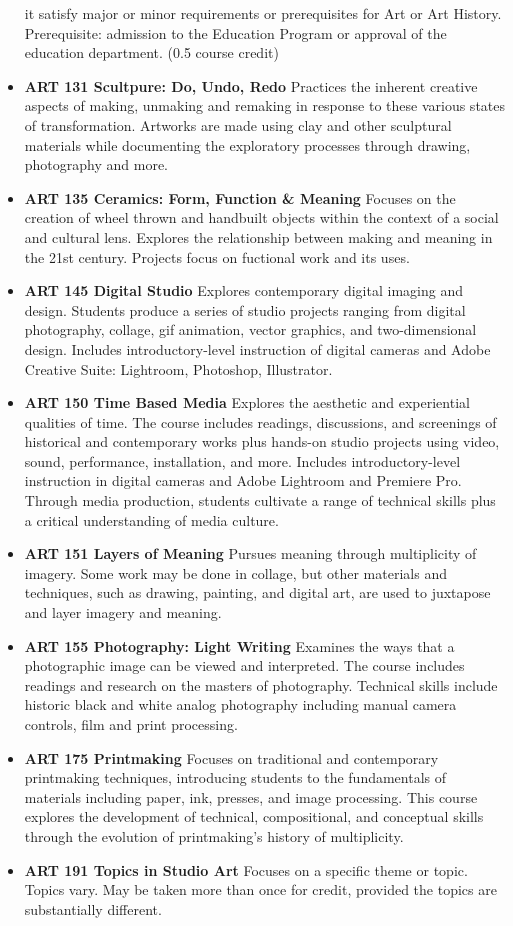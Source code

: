 \documentclass[
  letterpaper,
]{scrbook}
\begin{document}
\begin{itemize}
  it satisfy major or minor requirements or prerequisites for Art or Art
  History. Prerequisite: admission to the Education Program or approval
  of the education department. (0.5 course credit)
\item
  \textbf{ART 131 Scultpure: Do, Undo, Redo} Practices the inherent
  creative aspects of making, unmaking and remaking in response to these
  various states of transformation. Artworks are made using clay and
  other sculptural materials while documenting the exploratory processes
  through drawing, photography and more.
\item
  \textbf{ART 135 Ceramics: Form, Function \& Meaning} Focuses on the
  creation of wheel thrown and handbuilt objects within the context of a
  social and cultural lens. Explores the relationship between making and
  meaning in the 21st century. Projects focus on fuctional work and its
  uses.
\item
  \textbf{ART 145 Digital Studio} Explores contemporary digital imaging
  and design. Students produce a series of studio projects ranging from
  digital photography, collage, gif animation, vector graphics, and
  two-dimensional design. Includes introductory-level instruction of
  digital cameras and Adobe Creative Suite: Lightroom, Photoshop,
  Illustrator.
\item
  \textbf{ART 150 Time Based Media} Explores the aesthetic and
  experiential qualities of time. The course includes readings,
  discussions, and screenings of historical and contemporary works plus
  hands-on studio projects using video, sound, performance,
  installation, and more. Includes introductory-level instruction in
  digital cameras and Adobe Lightroom and Premiere Pro. Through media
  production, students cultivate a range of technical skills plus a
  critical understanding of media culture.
\item
  \textbf{ART 151 Layers of Meaning} Pursues meaning through
  multiplicity of imagery. Some work may be done in collage, but other
  materials and techniques, such as drawing, painting, and digital art,
  are used to juxtapose and layer imagery and meaning.
\item
  \textbf{ART 155 Photography: Light Writing} Examines the ways that a
  photographic image can be viewed and interpreted. The course includes
  readings and research on the masters of photography. Technical skills
  include historic black and white analog photography including manual
  camera controls, film and print processing.
\item
  \textbf{ART 175 Printmaking} Focuses on traditional and contemporary
  printmaking techniques, introducing students to the fundamentals of
  materials including paper, ink, presses, and image processing. This
  course explores the development of technical, compositional, and
  conceptual skills through the evolution of printmaking's history of
  multiplicity.
\item
  \textbf{ART 191 Topics in Studio Art} Focuses on a specific theme or
  topic. Topics vary. May be taken more than once for credit, provided
  the topics are substantially different.
\end{itemize}
\end{document}
